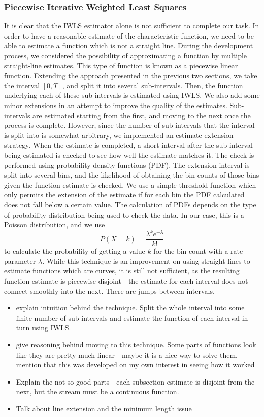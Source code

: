 \documentclass[a4paper,11pt]{article}
\begin{document}
\subsubsection{Piecewise Iterative Weighted Least Squares}
\label{sec-6-1-3}

It is clear that the IWLS estimator alone is not sufficient to complete our
task. In order to have a reasonable estimate of the characteristic function, we
need to be able to estimate a function which is not a straight line. During the
development process, we considered the possibility of approximating a function
by multiple straight-line estimates. This type of function is known as a
piecewise linear function. Extending the approach presented in the previous two
sections, we take the interval $[0,T]$, and split it into several
sub-intervals. Then, the function underlying each of these sub-intervals is
estimated using IWLS. We also add some minor extensions in an attempt to improve
the quality of the estimates. Sub-intervals are estimated starting from the
first, and moving to the next once the process is complete. However, since the
number of sub-intervals that the interval is split into is somewhat arbitrary,
we implemented an estimate extension strategy. When the estimate is completed, a
short interval after the sub-interval being estimated is checked to see how well
the estimate matches it. The check is performed using probability density
functions (PDF). The extension interval is split into several bins, and the
likelihood of obtaining the bin counts of those bins given the function estimate
is checked. We use a simple threshold function which only permits the extension
of the estimate if for each bin the PDF calculated does not fall below a certain
value. The calculation of PDFs depends on the type of probability distribution
being used to check the data. In our case, this is a Poisson distribution, and
we use
\begin{equation}
P(X=k)=\frac{\lambda^ke^{-\lambda}}{k!}
\end{equation}
to calculate the probability of getting a value $k$ for the bin count with a
rate parameter $\lambda$. While this technique is an improvement on using
straight lines to estimate functions which are curves, it is still not
sufficient, as the resulting function estimate is piecewise disjoint---the
estimate for each interval does not connect smoothly into the next. There are
jumps between intervals.
\begin{itemize}
\item explain intuition behind the technique. Split the whole interval into some
  finite number of sub-intervals and estimate the function of each interval in
  turn using IWLS.
\item give reasoning behind moving to this technique. Some parts of functions look
  like they are pretty much linear - maybe it is a nice way to solve
  them. mention that this was developed on my own interest in seeing how it worked
\item Explain the not-so-good parts - each subsection estimate is disjoint from the
  next, but the stream must be a continuous function.
\item Talk about line extension and the minimum length issue
\end{itemize}
\end{document}

